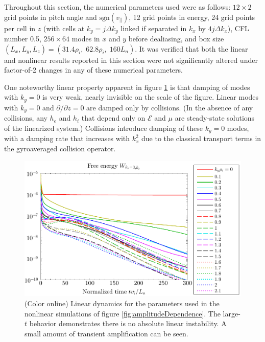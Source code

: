 \documentclass[12pt,superscriptaddress]{revtex4}
\newcommand{\energy}{\mathcal{E}}
\newcommand{\sgn}{\mathrm{sgn}}
\begin{document}
Throughout this section, the numerical parameters used were as follows: $12 \times 2$ grid points in pitch angle and $\sgn(v_{||})$, 12 grid points in energy, 24 grid points per cell in $z$ (with cells at $k_y=j \Delta k_y$ linked if separated in $k_x$ by $4 j \Delta k_x$), CFL number 0.5, $256 \times 64$ modes in $x$ and $y$ before dealiasing, and box size $(L_x, L_y, L_z) = (31.4 \rho_i, \; 62.8 \rho_i, \; 160 L_n)$.  It was verified that both the linear and nonlinear results reported in this section were not significantly altered under factor-of-2 changes in any of these numerical parameters.

One noteworthy linear property apparent in figure \ref{fig:linearBox}
is that damping of modes with $k_y=0$ is very weak,
nearly invisible on the scale of the figure.
Linear modes with $k_y=0$ and $\partial/\partial z=0$ are damped only by collisions.
(In the absence of any collisions, any $h_e$ and $h_i$ that depend only on $\energy$ and $\mu$ are steady-state solutions of the linearized system.)
Collisions introduce damping of these $k_y=0$ modes, with a damping rate that increases with $k_x^2$ due to the classical transport terms in the gyroaveraged collision operator.


\begin{figure}[h!]
\includegraphics[width=6.5in]{m20141126_01_plotWVsTimeForPaper_linearBox.pdf}
\caption{(Color online)
Linear dynamics for the parameters used in the
nonlinear simulations of figure \ref{fig:amplitudeDependence}.
The large-$t$ behavior demonstrates there is no absolute linear instability.
A small amount of transient amplification can be seen.
\label{fig:linearBox}}
\end{figure}
\end{document}
